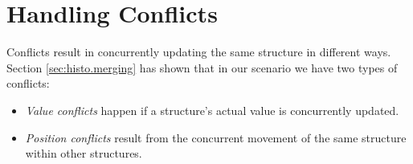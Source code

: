 
\section{Handling Conflicts}
\label{sec:histo.conflicts}

Conflicts result in concurrently updating the same structure in different ways.
Section \ref{sec:histo.merging} has shown that in our scenario we have two types of conflicts:

\begin{itemize}
\item \emph{Value conflicts} happen if a structure's actual value is concurrently updated.
\item \emph{Position conflicts} result from the concurrent movement of the same structure within other structures.
\end{itemize}

